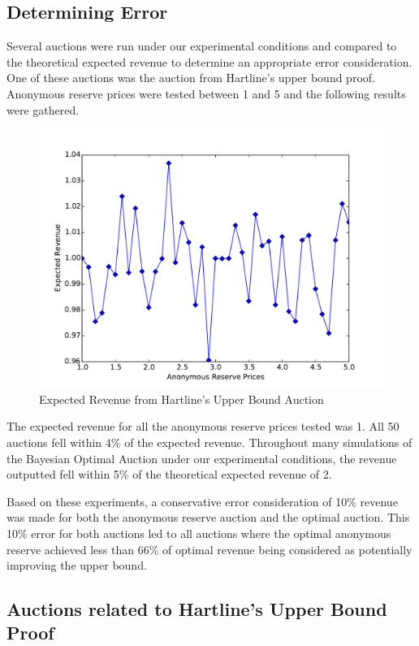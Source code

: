 \documentclass{acm_proc_article-sp}
\begin{document}
\subsection{Determining Error}

Several auctions were run under our experimental conditions and compared to the theoretical expected revenue to determine an appropriate error consideration. One of  these auctions was the auction from Hartline's upper bound proof. Anonymous reserve prices were tested between 1 and 5 and the following results were gathered.

	\begin{figure}[!htbp]
   		\centering
  		\includegraphics[width=\linewidth]{Hartline.pdf}
    		\caption{Expected Revenue from Hartline's Upper Bound Auction}
    		\label{Figure 1}
	\end{figure}
	
The expected revenue for all the anonymous reserve prices tested was 1. All 50 auctions fell within 4\% of the expected revenue. Throughout many simulations of the Bayesian Optimal Auction under our experimental conditions, the revenue outputted fell within 5\% of the theoretical expected revenue of 2.

Based on these experiments, a conservative error consideration of 10\% revenue was made for both the anonymous reserve auction and the optimal auction. This 10\% error for both auctions led to all auctions where the optimal anonymous reserve achieved less than 66\% of optimal revenue being considered as potentially improving the upper bound.

\subsection{Auctions related to Hartline's Upper Bound Proof}
\end{document}
